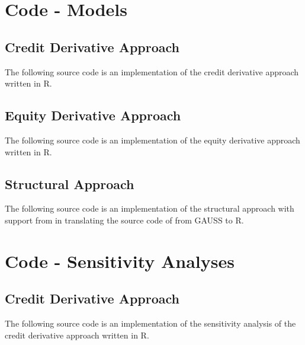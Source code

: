 \chapter{Code - Models} \label{creditderivativeapproach}
\section{Credit Derivative Approach} \label{creditderivativeapproach}

The following source code is an implementation of the credit derivative approach \citep{de2011pricing} written in R.
 


\section{Equity Derivative Approach} \label{equityderivativeapproach}

The following source code is an implementation of the equity derivative approach \citep{de2011pricing} written in R.
 


\section{Structural Approach} \label{structuralapproach}

The following source code is an implementation of the structural approach \citep{pennacchi2010structural} with support from \citet{codestructrural} in translating the source code of \citet{pennacchi2010structural} from GAUSS to R.
 


\chapter{Code - Sensitivity Analyses}

\section{Credit Derivative Approach} \label{sensicredit}

The following source code is an implementation of the sensitivity analysis of the credit derivative approach \citep{de2011pricing} written in R.
 


